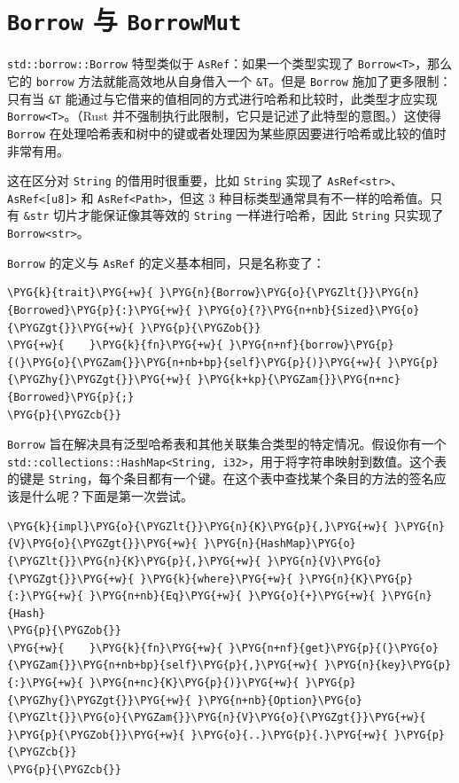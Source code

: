 \section{\texttt{Borrow} 与 \texttt{BorrowMut}}

\texttt{std::borrow::Borrow} 特型类似于 \texttt{AsRef}：如果一个类型实现了 \texttt{Borrow<T>}，那么它的 \texttt{borrow} 方法就能高效地从自身借入一个 \texttt{\&T}。但是 \texttt{Borrow} 施加了更多限制：只有当 \texttt{\&T} 能通过与它借来的值相同的方式进行哈希和比较时，此类型才应实现 \texttt{Borrow<T>}。（Rust 并不强制执行此限制，它只是记述了此特型的意图。）这使得 \texttt{Borrow} 在处理哈希表和树中的键或者处理因为某些原因要进行哈希或比较的值时非常有用。

这在区分对 \texttt{String} 的借用时很重要，比如 \texttt{String} 实现了 \texttt{AsRef<str>}、\texttt{AsRef<[u8]>} 和 \texttt{AsRef<Path>}，但这 3 种目标类型通常具有不一样的哈希值。只有 \texttt{\&str} 切片才能保证像其等效的 \texttt{String} 一样进行哈希，因此 \texttt{String} 只实现了 \texttt{Borrow<str>}。

\texttt{Borrow} 的定义与 \texttt{AsRef} 的定义基本相同，只是名称变了：

\begin{Verbatim}[commandchars=\\\{\},breaklines=true,breakanywhere=true,fontsize=\codefont,xleftmargin=17bp]
\PYG{k}{trait}\PYG{+w}{ }\PYG{n}{Borrow}\PYG{o}{\PYGZlt{}}\PYG{n}{Borrowed}\PYG{p}{:}\PYG{+w}{ }\PYG{o}{?}\PYG{n+nb}{Sized}\PYG{o}{\PYGZgt{}}\PYG{+w}{ }\PYG{p}{\PYGZob{}}
\PYG{+w}{    }\PYG{k}{fn}\PYG{+w}{ }\PYG{n+nf}{borrow}\PYG{p}{(}\PYG{o}{\PYGZam{}}\PYG{n+nb+bp}{self}\PYG{p}{)}\PYG{+w}{ }\PYG{p}{\PYGZhy{}\PYGZgt{}}\PYG{+w}{ }\PYG{k+kp}{\PYGZam{}}\PYG{n+nc}{Borrowed}\PYG{p}{;}
\PYG{p}{\PYGZcb{}}
\end{Verbatim}

\texttt{Borrow} 旨在解决具有泛型哈希表和其他关联集合类型的特定情况。假设你有一个 \texttt{std::collections::HashMap<String, i32>}，用于将字符串映射到数值。这个表的键是 \texttt{String}，每个条目都有一个键。在这个表中查找某个条目的方法的签名应该是什么呢？下面是第一次尝试。

\begin{Verbatim}[commandchars=\\\{\},breaklines=true,breakanywhere=true,fontsize=\codefont,xleftmargin=17bp]
\PYG{k}{impl}\PYG{o}{\PYGZlt{}}\PYG{n}{K}\PYG{p}{,}\PYG{+w}{ }\PYG{n}{V}\PYG{o}{\PYGZgt{}}\PYG{+w}{ }\PYG{n}{HashMap}\PYG{o}{\PYGZlt{}}\PYG{n}{K}\PYG{p}{,}\PYG{+w}{ }\PYG{n}{V}\PYG{o}{\PYGZgt{}}\PYG{+w}{ }\PYG{k}{where}\PYG{+w}{ }\PYG{n}{K}\PYG{p}{:}\PYG{+w}{ }\PYG{n+nb}{Eq}\PYG{+w}{ }\PYG{o}{+}\PYG{+w}{ }\PYG{n}{Hash}
\PYG{p}{\PYGZob{}}
\PYG{+w}{    }\PYG{k}{fn}\PYG{+w}{ }\PYG{n+nf}{get}\PYG{p}{(}\PYG{o}{\PYGZam{}}\PYG{n+nb+bp}{self}\PYG{p}{,}\PYG{+w}{ }\PYG{n}{key}\PYG{p}{:}\PYG{+w}{ }\PYG{n+nc}{K}\PYG{p}{)}\PYG{+w}{ }\PYG{p}{\PYGZhy{}\PYGZgt{}}\PYG{+w}{ }\PYG{n+nb}{Option}\PYG{o}{\PYGZlt{}}\PYG{o}{\PYGZam{}}\PYG{n}{V}\PYG{o}{\PYGZgt{}}\PYG{+w}{ }\PYG{p}{\PYGZob{}}\PYG{+w}{ }\PYG{o}{..}\PYG{p}{.}\PYG{+w}{ }\PYG{p}{\PYGZcb{}}
\PYG{p}{\PYGZcb{}}
\end{Verbatim}

